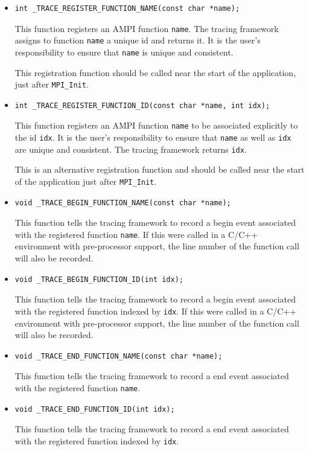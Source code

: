 \documentclass[10pt]{article}
\begin{document}
\begin{itemize}
\item 
\begin{verbatim}
int _TRACE_REGISTER_FUNCTION_NAME(const char *name);
\end{verbatim}
This function registers an AMPI function {\tt name}. The tracing
framework assigns to function {\tt name} a unique id and returns
it. It is the user's responsibility to ensure that {\tt name} is
unique and consistent.

This registration function should be called near the start of the
application, just after {\tt MPI\_Init}.

\item
\begin{verbatim}
int _TRACE_REGISTER_FUNCTION_ID(const char *name, int idx);
\end{verbatim}
This function registers an AMPI function {\tt name} to be associated
explicitly to the id {\tt idx}. It is the user's responsibility to 
ensure that {\tt name} as well as {\tt idx} are unique and consistent.
The tracing framework returns {\tt idx}.

This is an alternative registration function and should be called near
the start of the application just after {\tt MPI\_Init}.

\item
\begin{verbatim}
void _TRACE_BEGIN_FUNCTION_NAME(const char *name);
\end{verbatim}
This function tells the tracing framework to record a begin event
associated with the registered function {\tt name}. If this were called
in a C/C++ environment with pre-processor support, the line number of
the function call will also be recorded.

\item
\begin{verbatim}
void _TRACE_BEGIN_FUNCTION_ID(int idx);
\end{verbatim}
This function tells the tracing framework to record a begin event
associated with the registered function indexed by {\tt idx}. If this were
called in a C/C++ environment with pre-processor support, the line number
of the function call will also be recorded.

\item
\begin{verbatim}
void _TRACE_END_FUNCTION_NAME(const char *name);
\end{verbatim}
This function tells the tracing framework to record a end event
associated with the registered function {\tt name}.

\item
\begin{verbatim}
void _TRACE_END_FUNCTION_ID(int idx);
\end{verbatim}
This function tells the tracing framework to record a end event
associated with the registered function indexed by {\tt idx}.

\end{itemize}
\end{document}
